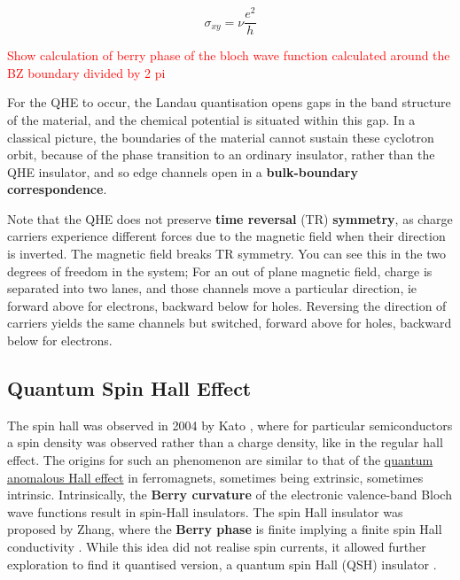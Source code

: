 \begin{equation} \label{eqn:qhe-conductivity}
	\sigma_{xy}=\nu \frac{e^2}{h}
\end{equation}


\textcolor{red}{Show calculation of berry phase of the bloch wave function calculated around the BZ boundary divided by 2 pi} %

For the QHE to occur, the Landau quantisation opens gaps in the band structure of the material, and the chemical potential is situated within this gap. In a classical picture, the boundaries of the material cannot sustain these cyclotron orbit, because of the phase transition to an ordinary insulator, rather than the QHE insulator, and so edge channels open in a \textbf{bulk-boundary correspondence}. 

Note that the QHE does not preserve \textbf{time reversal} (TR) \textbf{symmetry}, as charge carriers experience different forces due to the magnetic field when their direction is inverted. The magnetic field breaks TR symmetry. You can see this in the two degrees of freedom in the system; For an out of plane magnetic field, charge is separated into two lanes, and those channels move a particular direction, ie forward above for electrons, backward below for holes. Reversing the direction of carriers yields the same channels but switched, forward above for holes, backward below for electrons. 

\subsection{Quantum Spin Hall Effect}\label{sec:QSHE}
The spin hall was observed in 2004 by Kato \etal{} \cite{kato_observation_2004}, where for particular semiconductors a spin density was observed rather than a charge density, like in the regular hall effect.
The origins for such an phenomenon are similar to that of the \hyperref[sec:QAHE]{quantum anomalous Hall effect} in ferromagnets, sometimes being extrinsic, sometimes intrinsic. Intrinsically, the \textbf{Berry curvature} of the electronic valence-band Bloch wave functions result in spin-Hall insulators. The spin Hall insulator was proposed by Zhang, where the \textbf{Berry phase} is finite implying a finite spin Hall conductivity \cite{murakami_spin-hall_2004}. While this idea did not realise spin currents, it allowed further exploration to find it quantised version, a quantum spin Hall (QSH) insulator \cite{bernevig_quantum_2006, kane_z_2005,kane_quantum_2005}.

